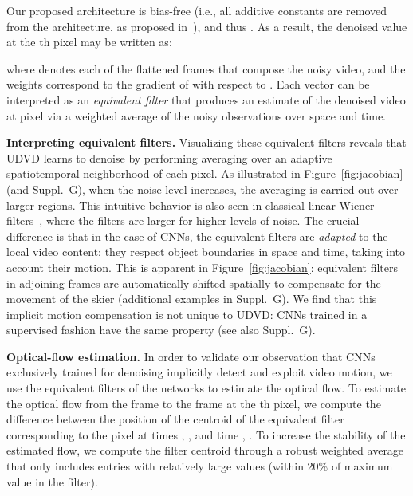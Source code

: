 \documentclass[final]{cvpr}
\begin{document}
Our proposed architecture is bias-free (i.e., all additive constants are removed from the architecture, as proposed in~\cite{biasfree}), and thus . As a result, the denoised value at the th pixel may be written as:

where  denotes each of the  flattened frames that compose the noisy video, and the weights  correspond to the gradient of  with respect to . 
Each vector  can be interpreted as an \emph{equivalent filter} that produces an estimate of the denoised video at pixel  via a weighted average of the noisy observations over space and time.

\noindent \textbf{Interpreting equivalent filters.} Visualizing these equivalent filters reveals that UDVD learns to denoise by performing  averaging over an adaptive spatiotemporal neighborhood of each pixel. As illustrated in Figure~\ref{fig:jacobian} (and Suppl.~G), when the noise level increases, the averaging is carried out over larger regions. This intuitive behavior is also seen in classical linear Wiener filters~\cite{wiener1950extrapolation}, where the filters are larger for higher levels of noise. The crucial difference is that in the case of CNNs, the equivalent filters are \emph{adapted} to the local video content: they respect object boundaries in space and time, taking into account their motion. This is apparent in Figure~\ref{fig:jacobian}: equivalent filters in adjoining frames are automatically shifted spatially to compensate for the movement of the skier (additional examples in Suppl.~G). We find that this implicit motion compensation is not unique to UDVD: CNNs trained in a supervised fashion have the same property (see also Suppl.~G). 

\noindent \textbf{Optical-flow estimation.} In order to validate our observation that CNNs exclusively trained for denoising implicitly detect and exploit video motion, we use the equivalent filters of the networks to estimate the optical flow. To estimate the optical flow from the  frame to the  frame at the th pixel, we compute the difference between the position of the centroid of the equivalent filter corresponding to the pixel at times , , and time , . To increase the stability of the estimated flow, we compute the filter centroid through a robust weighted average that only includes entries with relatively large values (within 20\% of maximum value in the filter). 
\end{document}
